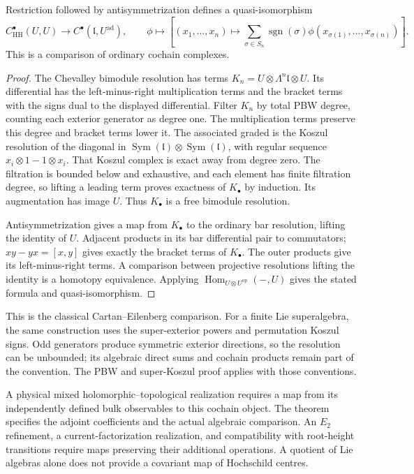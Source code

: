 \begin{theorem}\label{cyiv:hh-ce}
Restriction followed by antisymmetrization defines a quasi-isomorphism
\[
 C^\bullet_{\mathrm{HH}}(U,U)
 \longrightarrow C^\bullet(\mathfrak l,U^{\mathrm{ad}}),
 \qquad
 \phi\longmapsto\left[(x_1,\ldots,x_n)\mapsto
 \sum_{\sigma\in S_n}\operatorname{sgn}(\sigma)
 \phi(x_{\sigma(1)},\ldots,x_{\sigma(n)})\right].
\]
This is a comparison of ordinary cochain complexes.
\end{theorem}
\begin{proof}
The Chevalley bimodule resolution has terms
$K_n=U\otimes\Lambda^n\mathfrak l\otimes U$.
Its differential has the left-minus-right multiplication terms and
the bracket terms with the signs dual to the displayed differential.
Filter $K_n$ by total PBW degree, counting each exterior generator
as degree one.
The multiplication terms preserve this degree and bracket terms lower it.
The associated graded is the Koszul resolution of the diagonal in
$\operatorname{Sym}(\mathfrak l)\otimes\operatorname{Sym}(\mathfrak l)$,
with regular sequence $x_i\otimes1-1\otimes x_i$.
That Koszul complex is exact away from degree zero.
The filtration is bounded below and exhaustive, and each element has
finite filtration degree, so lifting a leading term proves exactness
of $K_\bullet$ by induction.
Its augmentation has image $U$.
Thus $K_\bullet$ is a free bimodule resolution.

Antisymmetrization gives a map from $K_\bullet$ to the ordinary bar
resolution, lifting the identity of $U$.
Adjacent products in its bar differential pair to commutators;
$xy-yx=[x,y]$ gives exactly the bracket terms of $K_\bullet$.
The outer products give its left-minus-right terms.
A comparison between projective resolutions lifting the identity is
a homotopy equivalence.
Applying $\operatorname{Hom}_{U\otimes U^{\mathrm{op}}}(-,U)$ gives
the stated formula and quasi-isomorphism.
\end{proof}

This is the classical Cartan--Eilenberg comparison.
For a finite Lie superalgebra, the same construction uses the
super-exterior powers and permutation Koszul signs.
Odd generators produce symmetric exterior directions, so the resolution
can be unbounded; its algebraic direct sums and cochain products remain
part of the convention.
The PBW and super-Koszul proof applies with those conventions.

A physical mixed holomorphic--topological realization requires a map
from its independently defined bulk observables to this cochain object.
The theorem specifies the adjoint coefficients and the actual algebraic
comparison.
An $E_2$ refinement, a current-factorization realization, and compatibility
with root-height transitions require maps preserving their additional
operations.
A quotient of Lie algebras alone does not provide a covariant map of
Hochschild centres.

